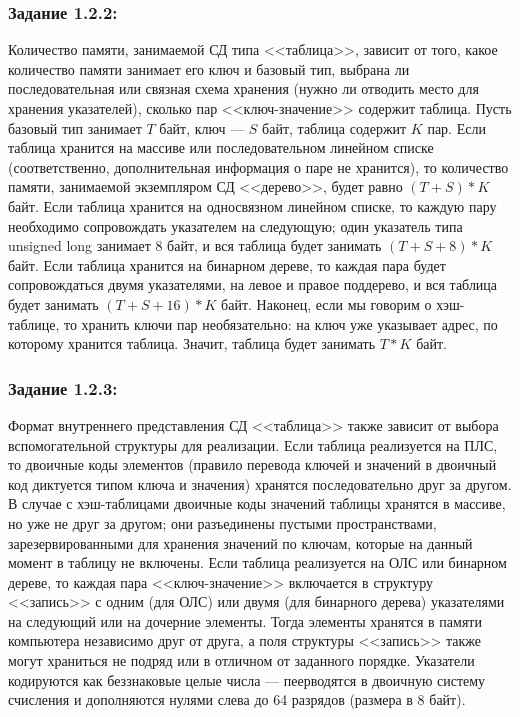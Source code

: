 \documentclass[12pt]{article}
\begin{document}
{	\subsubsection{Задание 1.2.2:}
	\label{task_1_2_2}
	Количество памяти, занимаемой СД типа <<таблица>>, зависит от того, какое количество памяти занимает его ключ и базовый тип, выбрана ли последовательная или связная схема хранения (нужно ли отводить место для хранения указателей), сколько пар <<ключ-значение>> содержит таблица. Пусть базовый тип занимает $T$ байт, ключ --- $S$ байт, таблица содержит $K$ пар. Если таблица хранится на массиве или последовательном линейном списке (соответственно, дополнительная информация о паре не хранится), то количество памяти, занимаемой экземпляром СД <<дерево>>, будет равно $(T+S)*K$ байт. Если таблица хранится на односвязном линейном списке, то каждую пару необходимо сопровождать указателем на следующую; один указатель типа unsigned long занимает 8 байт, и вся таблица будет занимать $(T+S+8)*K$ байт. Если таблица хранится на бинарном дереве, то каждая пара будет сопровождаться двумя указателями, на левое и правое поддерево, и вся таблица будет занимать $(T+S+16)*K$ байт. Наконец, если мы говорим о хэш-таблице, то хранить ключи пар необязательно: на ключ уже указывает адрес, по которому хранится таблица. Значит, таблица будет занимать $T*K$ байт.
	
	\subsubsection{Задание 1.2.3:}
	\label{task_1_2_3}
 	Формат внутреннего представления СД <<таблица>> также зависит от выбора вспомогательной структуры для реализации. Если таблица реализуется на ПЛС, то двоичные коды элементов (правило перевода ключей и значений в двоичный код диктуется типом ключа и значения) хранятся последовательно друг за другом. В случае с хэш-таблицами двоичные коды значений таблицы хранятся в массиве, но уже не друг за другом; они разъединены пустыми пространствами, зарезервированными для хранения значений по ключам, которые на данный момент в таблицу не включены. Если таблица реализуется на ОЛС или бинарном дереве, то каждая пара <<ключ-значение>> включается в структуру <<запись>> с одним (для ОЛС) или двумя (для бинарного дерева) указателями на следующий или на дочерние элементы. Тогда элементы хранятся в памяти компьютера независимо друг от друга, а поля структуры <<запись>> также могут храниться не подряд или в отличном от заданного порядке. Указатели кодируются как беззнаковые целые числа --- пеерводятся в двоичную систему счисления и дополняются нулями слева до 64 разрядов (размера в 8 байт).

}
\end{document}
